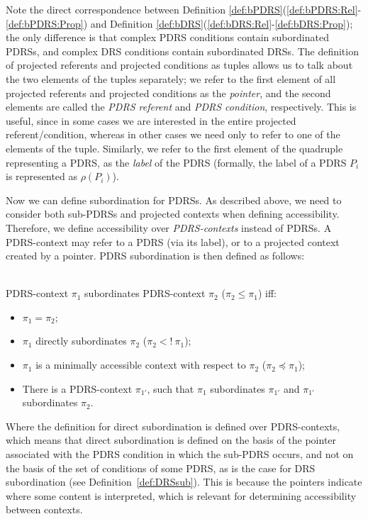\noindent Note the direct correspondence between Definition
\ref{def:bPDRS}(\ref{def:bPDRS:Rel}-\ref{def:bPDRS:Prop}) and Definition
\ref{def:bDRS}(\ref{def:bDRS:Rel}-\ref{def:bDRS:Prop}); the only difference
is that complex PDRS conditions contain subordinated PDRSs, and complex DRS
conditions contain subordinated DRSs.  The definition of projected referents
and projected conditions as tuples allows us to talk about the two elements
of the tuples separately; we refer to the first element of all projected
referents and projected conditions as the \textit{pointer}, and the second
elements are called the \textit{PDRS referent} and \textit{PDRS condition},
respectively. This is useful, since in some cases we are interested in the
entire projected referent/condition, whereas in other cases we need only to
refer to one of the elements of the tuple. Similarly, we refer to the first
element of the quadruple representing a PDRS, as the \textit{label} of the
PDRS (formally, the label of a PDRS $P_i$ is represented as $\rho(P_i)$).

Now we can define subordination for PDRSs. As described above, we need to
consider both sub-PDRSs and projected contexts when defining accessibility.
Therefore, we define accessibility over \textit{PDRS-contexts} instead of
PDRSs. A PDRS-context may refer to a PDRS (via its label), or to a projected
context created by a pointer. PDRS subordination is then defined as follows:

\begin{definition}~\\
PDRS-context $\pi_1$ subordinates PDRS-context $\pi_2$ ($\pi_2 \leq \pi_1$)
iff:
\begin{itemize}
  \item $\pi_1 = \pi_2$;
  \item $\pi_1$ directly subordinates $\pi_2$ ($\pi_2 <!~\pi_1$);
  \item $\pi_1$ is a minimally accessible context with respect to $\pi_2$
    ($\pi_2 \preceq \pi_1$);    
  \item There is a PDRS-context $\pi_{1'}$, such that $\pi_1$ subordinates
    $\pi_{1'}$ and $\pi_{1'}$ subordinates $\pi_2$.
\end{itemize}
\end{definition}

\noindent Where the definition for direct subordination is defined over
PDRS-contexts, which means that direct subordination is defined on the basis
of the pointer associated with the PDRS condition in which the sub-PDRS
occurs, and not on the basis of the set of conditions of some PDRS, as is
the case for DRS subordination (see Definition~\ref{def:DRSsub}).  This is
because the pointers indicate where some content is interpreted, which is
relevant for determining accessibility between contexts.

